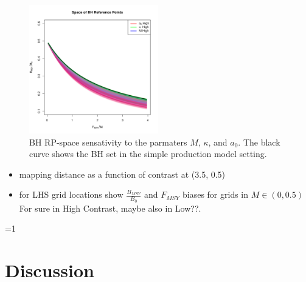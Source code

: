 \documentclass[12pt]{article}
\newcounter{alphasect}
\def\alphainsection{0}
\let\oldsection=\section
\def\section{%
  \ifnum\alphainsection=1%
    \addtocounter{alphasect}{1}
  \fi%
\oldsection}%
\begin{document}
\begin{figure}[h!]
\includegraphics[width=0.5\textwidth]{../ddBias/rpSpace.pdf} 

\vspace{-1cm}
\caption{
BH RP-space sensativity to the parmaters $M$, $\kappa$, and $a_0$. The black 
curve shows the BH set in the simple production model setting.
}
\label{ddRPs}
\end{figure}
 

\begin{itemize}
\item mapping distance as a function of contrast at (3.5, 0.5)

\item for LHS grid locations show $\frac{B_{MSY}}{B_0}$ and $F_{MSY}$ biases for grids in $M\in(0,0.5)$ For sure in High Contrast, maybe also in Low??.
\end{itemize}


%
\section{Discussion}
\end{document}
